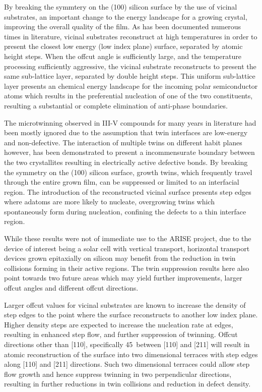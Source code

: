 By breaking the symmtery on the (100) silicon surface by the use of vicinal substrates, an important change to the energy landscape for a growing crystal, improving the overall quality of the film. As has been documented numerous times in literature, vicinal substrates reconstruct at high temperatures in order to present the closest low energy (low index plane) surface, separated by atomic height steps. When the offcut angle is sufficiently large, and the temperature processing sufficiently aggressive, the vicinal substrate reconstructs to present the same sub-lattice layer, separated by double height steps. This uniform sub-lattice layer presents an chemical energy landscape for the incoming polar semiconductor atoms which results in the preferential nucleation of one of the two constituents, resulting a substantial or complete elimination of anti-phase boundaries.

The microtwinning observed in III-V compounds for many years in literature had been mostly ignored due to the assumption that twin interfaces are low-energy and non-defective. The interaction of multiple twins on different habit planes however, has been demonstrated to present a incommensurate boundary between the two crystallites resulting in electrically active defective bonds. By breaking the symmetry on the (100) silicon surface, growth twins, which frequently travel through the entire grown film, can be suppressed or limited to an interfacial region. The introduction of the reconstructed vicinal surface presents step edges where adatoms are more likely to nucleate, overgrowing twins which spontaneously form during nucleation, confining the defects to a thin interface region.

While these results were not of immediate use to the ARISE project, due to the device of interest being a solar cell with vertical transport, horizontal transport devices grown epitaxially on silicon may benefit from the reduction in twin collisions forming in their active regions. The twin suppression results here also point towards two future areas which may yield further improvements, larger offcut angles and different offcut directions.

Larger offcut values for vicinal substrates are known to increase the density of step 
edges to the point where the surface reconstructs to another low index plane. Higher 
density steps are expected to increase the nucleation rate at edges, resulting in 
enhanced step flow, and further suppression of twinning. Offcut directions other than 
[110], specifically 45\degree~between [110] and [211] will result in atomic 
reconstruction of the surface into two dimensional terraces with step edges along [110] 
and [211] directions. Such two dimensional terraces could allow step flow growth and 
hence suppress twinning in two perpendicular directions, resulting in further reductions 
in twin collisions and reduction in defect density.